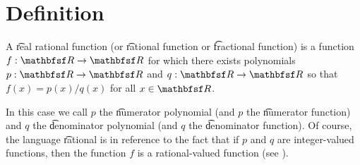 
\section*{Definition}

A \t{real rational function} (or \t{rational function} or \t{fractional function}) is a function $f: \R  \to \R $ for which there exists polynomials $p: \R  \to \R $ and $q: \R  \to \R $ so that $f(x) = p(x) / q(x)$ for all $x \in \R $.

In this case we call $p$ the \t{numerator polynomial} (and $p$ the \t{numerator function}) and $q$ the \t{denominator polynomial} (and $q$ the \t{denominator function}).
Of course, the language \t{rational} is in reference to the fact that if $p$ and $q$ are integer-valued functions, then the function $f$ is a rational-valued function (see ).

\blankpage
